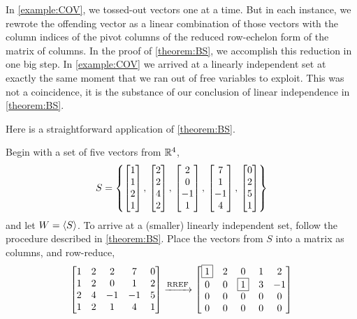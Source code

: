\documentclass{ximera}
\begin{document}
In \ref{example:COV}, we tossed-out vectors one at a time.  But in
each instance, we rewrote the offending vector as a linear combination
of those vectors with the column indices of the pivot columns of the
reduced row-echelon form of the matrix of columns.  In the proof of
\ref{theorem:BS}, we accomplish this reduction in one big step.  In
\ref{example:COV} we arrived at a linearly independent set at exactly
the same moment that we ran out of free variables to exploit.  This
was not a coincidence, it is the substance of our conclusion of linear
independence in \ref{theorem:BS}.

Here is a straightforward application of \ref{theorem:BS}.

\begin{example}
  Begin with a set of five vectors from $\mathbb{R}^{4}$,
  \[
    S=\left\{
      \begin{bmatrix} 1 \\ 1 \\ 2 \\ 1\end{bmatrix},\,
      \begin{bmatrix} 2 \\ 2 \\ 4 \\ 2\end{bmatrix},\,
      \begin{bmatrix} 2 \\ 0 \\ -1 \\ 1\end{bmatrix},\,
      \begin{bmatrix} 7 \\ 1 \\ -1 \\ 4\end{bmatrix},\,
      \begin{bmatrix} 0 \\ 2 \\ 5 \\ 1\end{bmatrix}
    \right\}
  \]
  and let $W=\left\langle S\right\rangle$.  To arrive at a (smaller) linearly independent
  set, follow the procedure described in \ref{theorem:BS}.  Place the
  vectors from $S$ into a matrix as columns, and row-reduce,
  \[
    \begin{bmatrix}
      1 & 2 & 2 & 7 & 0 \\
      1 & 2 & 0 & 1 & 2 \\
      2 & 4 & -1 & -1 & 5 \\
      1 & 2 & 1 & 4 & 1
    \end{bmatrix}
    \xrightarrow{\text{RREF}}
    \begin{bmatrix}
      \fbox{1} & 2 & 0 & 1 & 2 \\
      0 & 0 & \fbox{1} & 3 & -1 \\
      0 & 0 & 0 & 0 & 0 \\
      0 & 0 & 0 & 0 & 0
    \end{bmatrix}
  \]


\end{example}
\end{document}

